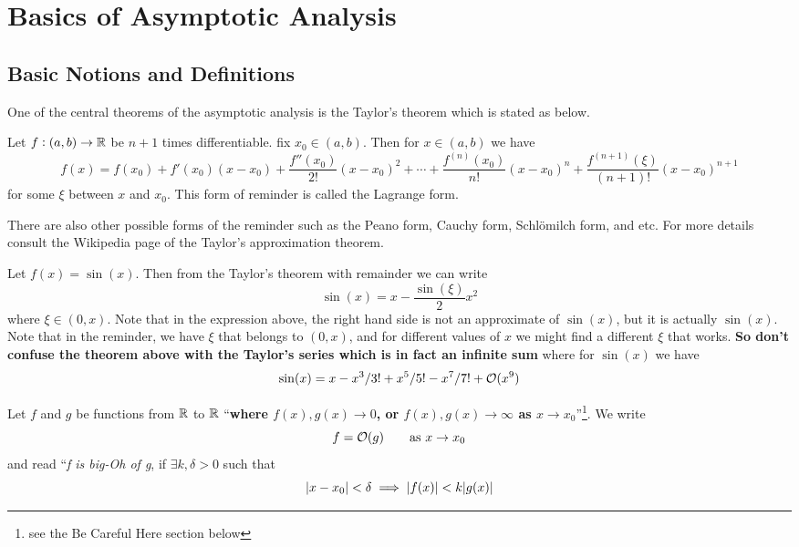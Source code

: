 \chapter{Basics of Asymptotic Analysis}

\section{Basic Notions and Definitions}

One of the central theorems of the asymptotic analysis is the Taylor's theorem which is stated as below.

\begin{theorem}
	Let $ f:(a,b) \to \mathbb{R} $ be $ n+1 $ times differentiable. fix $ x_0 \in (a,b) $. Then for $ x\in (a,b) $ we have
	\[ f(x) = f(x_0) + f'(x_0)(x-x_0) + \frac{f''(x_0)}{2!}(x-x_0)^2 + \cdots + \frac{f^{(n)}(x_0)}{n!}(x-x_0)^n + \frac{f^{(n+1)}(\xi)}{(n+1)!}(x-x_0)^{n+1} \]
	for some $ \xi $ between $ x $ and $ x_0 $. This form of reminder is called the Lagrange form.
\end{theorem}
\begin{remark}
	There are also other possible forms of the reminder such as the Peano form, Cauchy form,  Schlömilch form, and etc. For more details consult the Wikipedia page of the Taylor's approximation theorem.
\end{remark}

\begin{example}
	Let $ f(x) = \sin(x) $. Then from the Taylor's theorem with remainder we can write
	\[ \sin(x) = x - \frac{\sin(\xi)}{2}x^2 \]
	where $ \xi \in (0,x). $ Note that in the expression above, the right hand side is not an approximate of $ \sin(x) $, but it is actually $ \sin(x) $. Note that in the reminder, we have $ \xi $ that belongs to $ (0,x) $, and for different values of $ x $ we might find a different $ \xi $ that works. \textbf{So don't confuse the theorem above with the Taylor's series which is in fact an infinite sum} where for $  \sin(x) $ we have
	\[ \sin(x) = x - x^3/3! + x^5/5! - x^7/7! + \mathcal{O}(x^9) \]
\end{example}



\begin{definition}
	Let $ f $ and $ g $ be functions from $ \mathbb{R} $ to $ \mathbb{R} $ ``\textbf{where $ f(x), g(x)\to 0 $, or $ f(x),g(x) \to \infty $ as $ x \to x_0 $}''\footnote{see the Be Careful Here section below}. We write
	\[ f = \mathcal{O}(g) \qquad \text{as}\ x \to x_0 \]
	and read ``\emph{f is big-Oh of g}, if $ \exists k,\delta >0 $ such that
	\[ |x - x_0| < \delta \implies |f(x)| < k |g(x)| \]
\end{definition}

